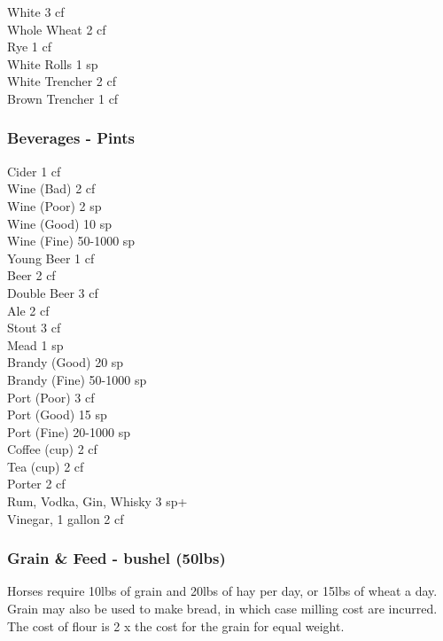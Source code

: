 \begin{multicols}{3}
{White					\hfill 3 cf \\
Whole Wheat				\hfill 2 cf \\
Rye					\hfill 1 cf \\
White Rolls				\hfill 1 sp \\
White Trencher				\hfill 2 cf \\
Brown Trencher				\hfill 1 cf \\


\subsubsection{Beverages - Pints}

Cider					\hfill 1 cf \\
Wine (Bad)				\hfill 2 cf \\
Wine (Poor)				\hfill 2 sp \\
Wine (Good)				\hfill 10 sp \\
Wine (Fine)				\hfill 50-1000 sp \\
Young Beer				\hfill 1 cf \\
Beer					\hfill 2 cf \\
Double Beer				\hfill 3 cf \\
Ale					\hfill 2 cf \\
Stout					\hfill 3 cf \\
Mead					\hfill 1 sp \\
Brandy (Good)				\hfill 20 sp \\
Brandy (Fine)				\hfill 50-1000 sp \\
Port (Poor)				\hfill 3 cf \\
Port (Good)				\hfill 15 sp \\
Port (Fine)				\hfill 20-1000 sp \\
Coffee (cup)				\hfill 2 cf \\
Tea (cup)				\hfill 2 cf \\
Porter					\hfill 2 cf \\
Rum, Vodka, Gin, Whisky			\hfill 3 sp+ \\
Vinegar, 1 gallon			\hfill 2 cf \\


\subsubsection{Grain \& Feed - bushel (50lbs)}

Horses require 10lbs of grain and 20lbs of hay per day, or 15lbs of
wheat a day.  Grain may also be used to make bread, in which case
milling cost are incurred.  The cost of flour is 2 x the cost for the
grain for equal weight.

}
\end{multicols}
